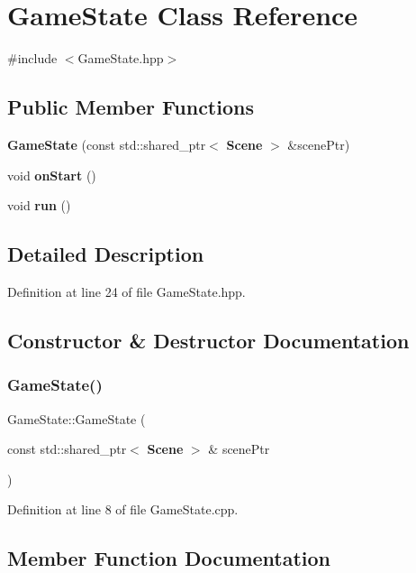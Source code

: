 \section{Game\+State Class Reference}
\label{class_game_state}


{\ttfamily \#include $<$Game\+State.\+hpp$>$}

\subsection*{Public Member Functions}
\begin{DoxyCompactItemize}
\item 
\textbf{ Game\+State} (const std\+::shared\+\_\+ptr$<$ \textbf{ Scene} $>$ \&scene\+Ptr)
\item 
void \textbf{ on\+Start} ()
\item 
void \textbf{ run} ()
\end{DoxyCompactItemize}


\subsection{Detailed Description}


Definition at line 24 of file Game\+State.\+hpp.



\subsection{Constructor \& Destructor Documentation}
\mbox{\label{class_game_state_af6c6ce13bb412e23880c062044574bfc}} 
\subsubsection{Game\+State()}
{\footnotesize\ttfamily Game\+State\+::\+Game\+State (\begin{DoxyParamCaption}\item[{const std\+::shared\+\_\+ptr$<$ \textbf{ Scene} $>$ \&}]{scene\+Ptr }\end{DoxyParamCaption})}



Definition at line 8 of file Game\+State.\+cpp.



\subsection{Member Function Documentation}
\mbox{\label{class_game_state_a3b426f55ad7053f77f24eaae38cf2f9e}} 
